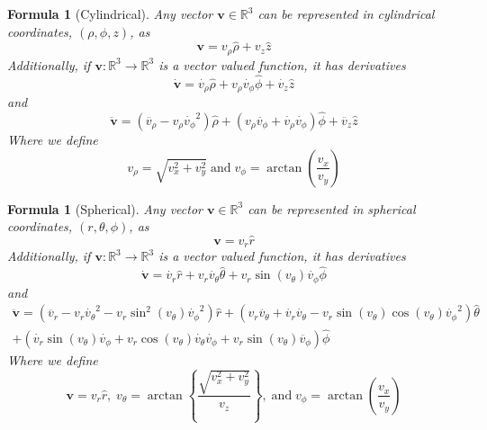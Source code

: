 \documentclass[12pt]{article}
\newtheorem{for}[thm]{Formula}
\theoremstyle{definition}
\theoremstyle{remark}
\numberwithin{equation}{section}
\newcommand\R{\mathbb R}    %
\newcommand\B[1]{\textbf{#1}}
\begin{document}
\vspace{15pt}

\begin{for}[Cylindrical]
        Any vector $\B{v} \in \R^3$ can be represented in cylindrical coordinates, $(\rho,\phi,z)$, as
        \begin{equation}
                \B{v} = v_{\rho}\hat{\rho} + v_z\hat{z}
        \end{equation}
        Additionally, if $\B{v}:\R^3 \rightarrow \R^3$ is a vector valued function, it has derivatives 
        \begin{equation}
                \dot{\B{v}} = \dot{v_{\rho}}\hat{\rho} + v_{\rho}\dot{v_{\phi}}\hat{\phi} + \dot{v_z}\hat{z}
        \end{equation}
        and
        \begin{equation}
                \ddot{\B{v}} = (\ddot{v_{\rho}}-v_{\rho}\dot{v_{\phi}}^2)\hat{\rho}+(v_{\rho}\ddot{v_{\phi}}+\dot{v_{\rho}}\dot{v_{\phi}})\hat{\phi} + \ddot{v_z}\hat{z}
        \end{equation}
        Where we define
        \begin{equation}
                v_{\rho} = \sqrt{v_x^2+v_y^2}\; \text{and}\; v_{\phi} = \arctan\left(\frac{v_x}{v_y}\right)
        \end{equation}
\end{for}

\vspace{15pt}


\begin{for}[Spherical]
        Any vector $\B{v} \in \R^3$ can be represented in spherical coordinates, $(r,\theta,\phi)$, as
        \begin{equation}
                \B{v} = v_r\hat{r}
        \end{equation}
        Additionally, if $\B{v}:\R^3 \rightarrow \R^3$ is a vector valued function, it has derivatives 
        \begin{equation}
                \dot{\B{v}} = \dot{v_r}\hat{r} + v_r\dot{v_{\theta}}\hat{\theta} + v_r\sin(v_{\theta})\dot{v_{\phi}}\hat{\phi}
        \end{equation}
        and
        \begin{align}
                \ddot{\B{v}} = (\ddot{v_r}-v_r\dot{v_{\theta}}^2-v_r\sin^2(v_{\theta})\dot{v_{\phi}}^2)\hat{r}+(v_r\ddot{v_{\theta}}+\dot{v_r}\dot{v_{\theta}}-v_r\sin(v_{\theta})\cos(v_{\theta})\dot{v_{\phi}}^2)\hat{\theta}& \\
                + (\dot{v_r}\sin(v_{\theta})\dot{v_{\phi}}+v_r\cos(v_{\theta})\dot{v_{\theta}}\dot{v_{\phi}}+v_r\sin(v_{\theta})\ddot{v_{\phi}})\hat{\phi}&
        \end{align}
        Where we define
        \begin{equation}
                \B{v} = v_r\hat{r},\; v_{\theta} = \arctan\left\{\frac{\sqrt{v_x^2+v_y^2}}{v_z}\right\},\; \text{and} \;v_{\phi} = \arctan\left(\frac{v_x}{v_y}\right)       
        \end{equation}
\end{for}
\end{document}
